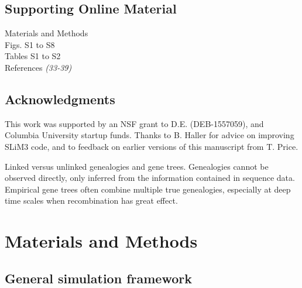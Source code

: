 \documentclass[12pt]{article}
\begin{document}
\subsection*{Supporting Online Material}
Materials and Methods\\
Figs. S1 to S8\\
Tables S1 to S2\\
References \textit{(33-39)}


\subsection*{Acknowledgments}
This work was supported by an NSF grant to D.E. (DEB-1557059), 
and Columbia University startup funds. Thanks to B. Haller for 
advice on improving SLiM3 code, and to feedback on earlier versions
of this manuscript from T. Price.


% 
% 


\clearpage


  Linked versus unlinked genealogies and gene trees. Genealogies cannot be 
  observed directly, only inferred from the information contained in sequence
  data. Empirical gene trees often combine multiple true genealogies, 
  especially at deep time scales when recombination has great effect.
\clearpage






\section*{Materials and Methods}

\subsection*{General simulation framework}




\end{document}
